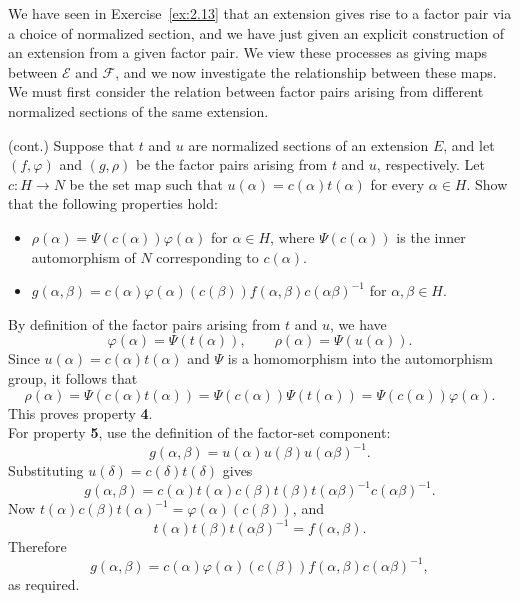 \documentclass[../Odyssey_Project.tex]{subfiles}
\begin{document}
We have seen in Exercise~\ref{ex:2.13} that an extension gives rise to a factor pair via a choice of normalized section, and we have just given an explicit construction of an extension from a given factor pair. We view these processes as giving maps between $\mathcal{E}$ and $\mathcal{F}$, and we now investigate the relationship between these maps. We must first consider the relation between factor pairs arising from different normalized sections of the same extension.

\begin{exercise}
\label{ex:9.4}
(cont.) Suppose that $t$ and $u$ are normalized sections of an extension $E$, and let $(f, \varphi)$ and $(g, \rho)$ be the factor pairs arising from $t$ and $u$, respectively. Let $c: H \to N$ be the set map such that $u(\alpha) = c(\alpha) t(\alpha)$ for every $\alpha \in H$. Show that the following properties hold:
\begin{itemize}
    \item[\textbf{4}] $\rho(\alpha) = \Psi(c(\alpha)) \varphi(\alpha)$ for $\alpha \in H$, where $\Psi(c(\alpha))$ is the inner automorphism of $N$ corresponding to $c(\alpha)$.
    \item[\textbf{5}] $g(\alpha, \beta) = c(\alpha) \varphi(\alpha)(c(\beta)) f(\alpha, \beta) c(\alpha \beta)^{-1}$ for $\alpha, \beta \in H$.
\end{itemize}
\end{exercise}
\begin{solution}
By definition of the factor pairs arising from $t$ and $u$, we have
\[
    \varphi(\alpha)=\Psi(t(\alpha)),
    \qquad
    \rho(\alpha)=\Psi(u(\alpha)).
\]
Since $u(\alpha)=c(\alpha)t(\alpha)$ and $\Psi$ is a homomorphism into the automorphism group, it follows that
\[
    \rho(\alpha)
    =
    \Psi(c(\alpha)t(\alpha))
    =
    \Psi(c(\alpha))\Psi(t(\alpha))
    =
    \Psi(c(\alpha))\varphi(\alpha).
\]
This proves property \textbf{4}.\\
For property \textbf{5}, use the definition of the factor-set component:
\[
    g(\alpha,\beta)=u(\alpha)u(\beta)u(\alpha\beta)^{-1}.
\]
Substituting $u(\delta)=c(\delta)t(\delta)$ gives
\[
    g(\alpha,\beta)
    =
    c(\alpha)t(\alpha)c(\beta)t(\beta)t(\alpha\beta)^{-1}c(\alpha\beta)^{-1}.
\]
Now $t(\alpha)c(\beta)t(\alpha)^{-1}=\varphi(\alpha)(c(\beta))$, and
\[
    t(\alpha)t(\beta)t(\alpha\beta)^{-1}=f(\alpha,\beta).
\]
Therefore
\[
    g(\alpha,\beta)
    =
    c(\alpha)\varphi(\alpha)(c(\beta))f(\alpha,\beta)c(\alpha\beta)^{-1},
\]
as required.
\end{solution}
\end{document}

